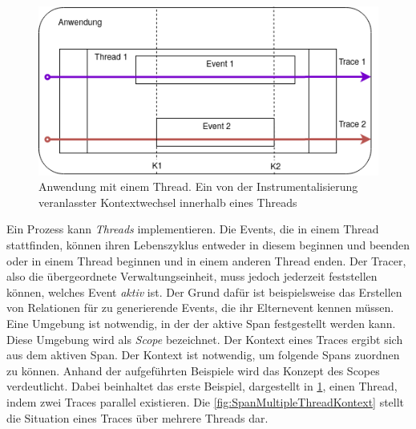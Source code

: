\begin{figure}[!ht]
	\centering
	\includegraphics[scale=0.5]{img/Design/SpanThreadKontext.png}
	\caption[Tracingkontexts in einem Threads innerhalb einer Anwendung]{Anwendung mit einem Thread. Ein von der Instrumentalisierung veranlasster Kontextwechsel innerhalb eines Threads}
	\label{fig:SpanThreadKontext}
\end{figure}


Ein Prozess kann \emph{Threads} implementieren. Die Events, die in einem Thread stattfinden, können ihren Lebenszyklus entweder in diesem beginnen und beenden oder in einem Thread beginnen und in einem anderen Thread enden. Der Tracer, also die übergeordnete Verwaltungseinheit, muss jedoch jederzeit feststellen können, welches Event \emph{aktiv} ist. Der Grund dafür ist beispielsweise das Erstellen von Relationen für zu generierende Events, die ihr Elternevent kennen müssen. Eine Umgebung ist notwendig, in der der aktive Span festgestellt werden kann. Diese Umgebung wird als \emph{Scope} bezeichnet. Der Kontext eines Traces ergibt sich aus dem aktiven Span. Der Kontext ist notwendig, um folgende Spans zuordnen zu können. Anhand der aufgeführten Beispiele wird das Konzept des Scopes verdeutlicht. Dabei beinhaltet das erste Beispiel, dargestellt in \cref{fig:SpanThreadKontext}, einen Thread, indem zwei Traces parallel existieren. Die \cref{fig:SpanMultipleThreadKontext} stellt die Situation eines Traces über mehrere Threads dar.

